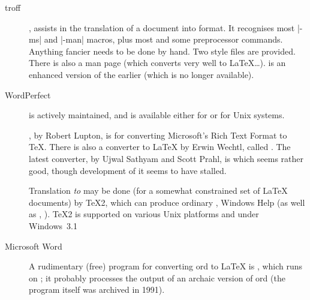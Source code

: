 
\begin{description}
\item[troff], assists in the translation of a
   document into \LaTeXo{} format.  It recognises most
  |-ms| and |-man| macros, plus most  and some
   preprocessor commands.  Anything fancier needs to be
  done by hand. Two style files are provided. There is also a man page
  (which converts very well to \LaTeX{}\dots{}).
   is an enhanced version of the earlier
   (which is no longer available).


  
\item[WordPerfect]  is actively maintained, and is
  available either for \MSDOS{} or for Unix systems.
\item[] , by Robert Lupton, is for
  converting Microsoft's Rich Text Format to \TeX{}.  There is also a
  converter to \LaTeX{} by Erwin Wechtl, called .
  The latest converter, by Ujwal Sathyam and Scott Prahl, is
   which seems rather good, though development
  of it seems to have stalled.

  Translation \emph{to}  may be done (for a somewhat
  constrained set of \LaTeX{} documents) by \TeX{}2, which
  can produce ordinary , Windows Help  (as well as
  , ).
  \TeX{}2 is supported on various Unix platforms and under
  Windows~3.1
\item[Microsoft Word] A rudimentary (free) program for converting
  ord to \LaTeX{} is , which runs on \MSDOS{};
  it probably processes the output of an archaic version of
  ord (the program itself was archived in 1991).


\end{description}

